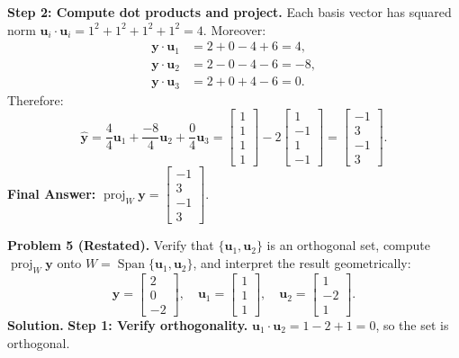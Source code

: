 \documentclass[11pt, letterpaper]{article}
\theoremstyle{definition}
\theoremstyle{remark}
\begin{document}
\textbf{Step 2: Compute dot products and project.}
Each basis vector has squared norm $\mathbf{u}_i \cdot \mathbf{u}_i = 1^2 + 1^2 + 1^2 + 1^2 = 4$. Moreover:
\begin{align*}
\mathbf{y} \cdot \mathbf{u}_1 &= 2 + 0 - 4 + 6 = 4, \\
\mathbf{y} \cdot \mathbf{u}_2 &= 2 - 0 - 4 - 6 = -8, \\
\mathbf{y} \cdot \mathbf{u}_3 &= 2 + 0 + 4 - 6 = 0.
\end{align*}
Therefore:
\[
\hat{\mathbf{y}} = \frac{4}{4}\mathbf{u}_1 + \frac{-8}{4}\mathbf{u}_2 + \frac{0}{4}\mathbf{u}_3 = \begin{bmatrix} 1 \\ 1 \\ 1 \\ 1 \end{bmatrix} - 2\begin{bmatrix} 1 \\ -1 \\ 1 \\ -1 \end{bmatrix} = \begin{bmatrix} -1 \\ 3 \\ -1 \\ 3 \end{bmatrix}.
\]
\textbf{Final Answer:} $\operatorname{proj}_W \mathbf{y} = \begin{bmatrix} -1 \\ 3 \\ -1 \\ 3 \end{bmatrix}$.

\medskip
\textbf{Problem 5 (Restated).} Verify that $\{\mathbf{u}_1, \mathbf{u}_2\}$ is an orthogonal set, compute $\operatorname{proj}_W \mathbf{y}$ onto $W = \operatorname{Span}\{\mathbf{u}_1, \mathbf{u}_2\}$, and interpret the result geometrically:
\[
\mathbf{y} = \begin{bmatrix} 2 \\ 0 \\ -2 \end{bmatrix}, \quad \mathbf{u}_1 = \begin{bmatrix} 1 \\ 1 \\ 1 \end{bmatrix}, \quad \mathbf{u}_2 = \begin{bmatrix} 1 \\ -2 \\ 1 \end{bmatrix}.
\]
\textbf{Solution.}
\textbf{Step 1: Verify orthogonality.} $\mathbf{u}_1 \cdot \mathbf{u}_2 = 1 - 2 + 1 = 0$, so the set is orthogonal.
\end{document}
